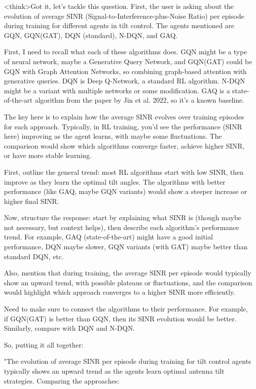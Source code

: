 <think>Got it, let's tackle this question. First, the user is asking about the evolution of average SINR (Signal-to-Interference-plus-Noise Ratio) per episode during training for different agents in tilt control. The agents mentioned are GQN, GQN(GAT), DQN (standard), N-DQN, and GAQ. 

First, I need to recall what each of these algorithms does. GQN might be a type of neural network, maybe a Generative Query Network, and GQN(GAT) could be GQN with Graph Attention Networks, so combining graph-based attention with generative queries. DQN is Deep Q-Network, a standard RL algorithm. N-DQN might be a variant with multiple networks or some modification. GAQ is a state-of-the-art algorithm from the paper by Jin et al. 2022, so it's a known baseline.

The key here is to explain how the average SINR evolves over training episodes for each approach. Typically, in RL training, you'd see the performance (SINR here) improving as the agent learns, with maybe some fluctuations. The comparison would show which algorithms converge faster, achieve higher SINR, or have more stable learning.

First, outline the general trend: most RL algorithms start with low SINR, then improve as they learn the optimal tilt angles. The algorithms with better performance (like GAQ, maybe GQN variants) would show a steeper increase or higher final SINR. 

Now, structure the response: start by explaining what SINR is (though maybe not necessary, but context helps), then describe each algorithm's performance trend. For example, GAQ (state-of-the-art) might have a good initial performance, DQN maybe slower, GQN variants (with GAT) maybe better than standard DQN, etc. 

Also, mention that during training, the average SINR per episode would typically show an upward trend, with possible plateaus or fluctuations, and the comparison would highlight which approach converges to a higher SINR more efficiently. 

Need to make sure to connect the algorithms to their performance. For example, if GQN(GAT) is better than GQN, then its SINR evolution would be better. Similarly, compare with DQN and N-DQN. 

So, putting it all together: 

"The evolution of average SINR per episode during training for tilt control agents typically shows an upward trend as the agents learn optimal antenna tilt strategies. Comparing the approaches: 

